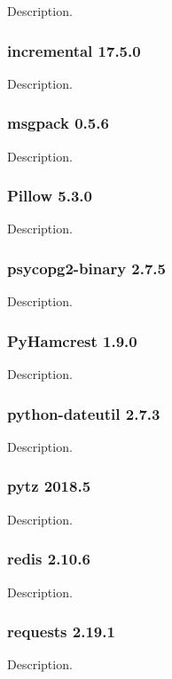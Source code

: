 Description.

\subsubsection{incremental 17.5.0}

Description.

\subsubsection{msgpack 0.5.6}

Description.

\subsubsection{Pillow 5.3.0}

Description.

\subsubsection{psycopg2-binary 2.7.5}

Description.

\subsubsection{PyHamcrest 1.9.0}

Description.

\subsubsection{python-dateutil 2.7.3}

Description.

\subsubsection{pytz 2018.5}

Description.

\subsubsection{redis 2.10.6}

Description.

\subsubsection{requests 2.19.1}

Description.

